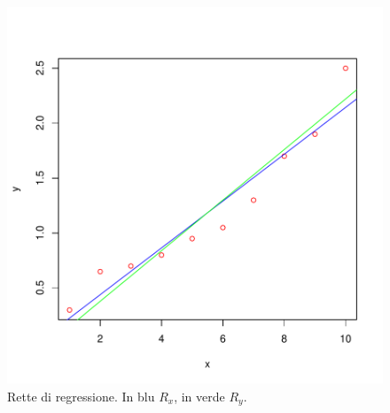 \documentclass[onecolumn,12pt]{book}
\begin{document}
\begin{center}
\begin{figure}[htbp]
\includegraphics{RbookParte2-131}
\caption{Rette di regressione. In blu $R_x$, in verde $R_y$.}
\label{fig:duerettex}
\end{figure}
\end{center}
\end{document}
